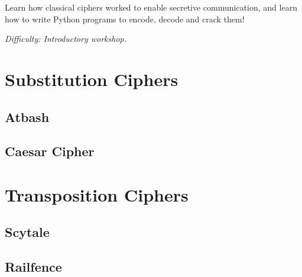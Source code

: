 %
%
%

\newif\ifprint
\printtrue



\newcommand{\workshopTitle}{Workshop 16: Ciphers}

\newcommand{\workshopAuthor}{Written by Jack Kelly}



	
	
	Learn how classical ciphers worked to enable secretive communication, and learn how to write Python programs to encode, decode and crack them!
	
	\textit{Difficulty: Introductory workshop.}
	
	\ifprint
		\renewcommand{\baselinestretch}{0.75}\normalsize
		\tableofcontents
		\renewcommand{\baselinestretch}{1.0}\normalsize
	\else
		\tableofcontents
	\fi
	
	
	

	\clearpage
	
	
	\webclearpage
	\section{Substitution Ciphers}
	\subsection{Atbash}
	\subsection{Caesar Cipher}
	
	\section{Transposition Ciphers}
	\subsection{Scytale}
	\subsection{Railfence}
	
	\clearpage

